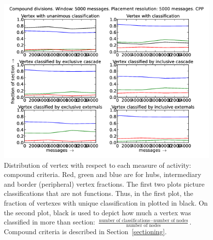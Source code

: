 \documentclass[%
 aip,
 jmp,%
 amsmath,amssymb,
 reprint,%
]{revtex4-1}
\begin{document}
\begin{figure}[hbtp] 
   \centering
        \includegraphics[width=\textwidth]{figs/CPP/5000_2}
    \caption{Distribution of vertex with respect to each measure of activity: compound criteria. Red, green and blue are for hubs, intermediary and border (peripheral) vertex fractions. The first two plots picture classifications that are not functions. Thus, in the first plot, the fraction of vertexes with unique classification in plotted in black. On the second plot, black is used to depict how much a vertex was classified in more than section: $\frac{\text{number of classifications} - \text{number of nodes}}{\text{number of nodes}}$. Compound criteria is described in Section~\ref{sectioning}.}
    \label{fig:cpp5000_}
\end{figure}
\end{document}
